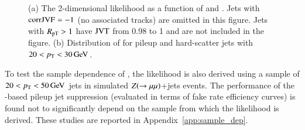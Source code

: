 \documentclass{atlasnote}
\begin{document}
\begin{figure}[!htbp]
  \centering
  \caption{(a) The 2-dimensional \JVT likelihood as a function of \cJVF and \RpT. Jets with ${\rm corrJVF}=-1$ (\ie no associated tracks) are omitted in this figure.
      Jets with $R_\mathrm{pT} >1$ have ${\rm JVT}$ from 0.98 to 1 and are not included in the figure.
     (b) Distribution of \JVT for pileup and hard-scatter jets with $20 < p_{\mathrm{T}} < 30\,\text{Ge\hspace{-.08em}V}$.}
\end{figure}

To test the sample dependence of \JVT, the likelihood is also derived using a sample of $20 < p_{\mathrm{T}} < 50\,\text{Ge\hspace{-.08em}V}$ jets in simulated $Z(\rightarrow\mu\mu)$+jets
events. The performance of the \JVT-based pileup jet suppression (evaluated in terms of fake rate \vs efficiency curves) is found not to significantly depend
on the sample from which the likelihood is derived. These studies are reported in Appendix~\ref{app:sample_dep}.


\end{document}
